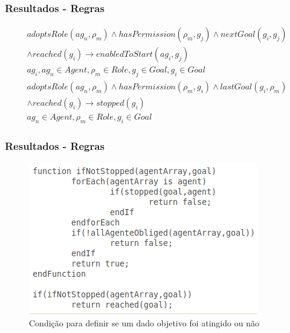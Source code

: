 \documentclass{beamer}
\begin{document}
\begin{frame}
	\frametitle{Resultados - Regras}
	\begin{eqnarray}\label{rolenextgoal}
		adoptsRole(ag_n,\rho_m) \wedge hasPermission(\rho_m,g_j) \wedge nextGoal(g_i,g_j) \nonumber \\
	 	\wedge reached(g_i) \to enabledToStart(ag_i,g_j) \nonumber \\
    	ag_i, ag_n \in Agent, \rho_m \in Role, g_j \in Goal, g_i \in Goal
	\end{eqnarray}
	\begin{eqnarray}\label{rolelastgoal}
		adoptsRole(ag_n,\rho_m) \wedge hasPermission(\rho_m,g_i) \wedge lastGoal(g_i,\rho_m) \nonumber \\
		\wedge reached(g_i) \to stopped(g_i) \nonumber \\
		ag_n \in Agent, \rho_m \in Role, g_i \in Goal
	\end{eqnarray}
\end{frame}
\begin{frame}
	\frametitle{Resultados - Regras}
	\begin{figure}[H]
		\centering
		\includegraphics[width=0.6\linewidth]{../dissertacao/figure/algrule6.png} 
		\caption{Condição para definir se um dado objetivo foi atingido ou não} \label{wenStop}  
	\end{figure}
\end{frame}
\end{document}
